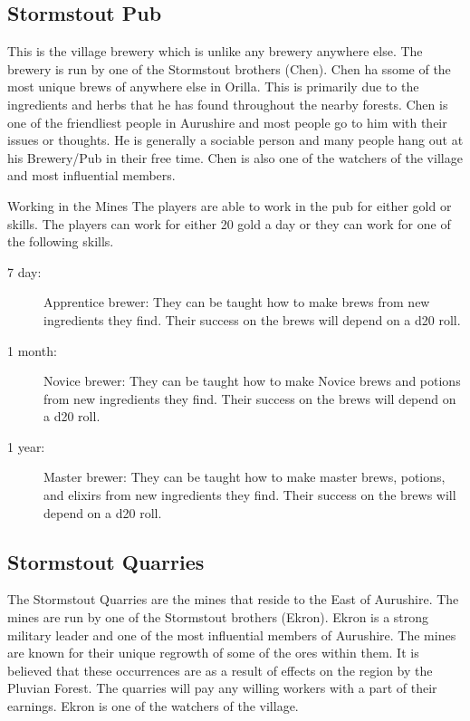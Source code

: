 \subsection{Stormstout Pub}

This is the village brewery which is unlike any brewery anywhere else. The brewery is run by one of the Stormstout brothers (Chen). Chen ha ssome of the most unique brews of anywhere else in Orilla. This is primarily due to the ingredients and herbs that he has found throughout the nearby forests. Chen is one of the friendliest people in Aurushire and most people go to him with their issues or thoughts. He is generally a sociable person and many people hang out at his Brewery/Pub in their free time. Chen is also one of the watchers of the village and most influential members.

\begin{commentbox}{Working in the Mines}
	The players are able to work in the pub for either gold or skills. The players can work for either 20 gold a day or they can work for one of the following skills.
	\begin{description}
		\item[7 day:] Apprentice brewer: They can be taught how to make brews from new ingredients they find. Their success on the brews will depend on a d20 roll.
		\item[1 month:] Novice brewer: They can be taught how to make Novice brews and potions from new ingredients they find. Their success on the brews will depend on a d20 roll.
		\item[1 year:] Master brewer: They can be taught how to make master brews, potions, and elixirs from new ingredients they find. Their success on the brews will depend on a d20 roll.
	\end{description}
\end{commentbox}

\subsection{Stormstout Quarries}

The Stormstout Quarries are the mines that reside to the East of Aurushire. The mines are run by one of the Stormstout brothers (Ekron). Ekron is a strong military leader and one of the most influential members of Aurushire. The mines are known for their unique regrowth of some of the ores within them. It is believed that these occurrences are as a result of effects on the region by the Pluvian Forest. The quarries will pay any willing workers with a part of their earnings. Ekron is one of the watchers of the village.

